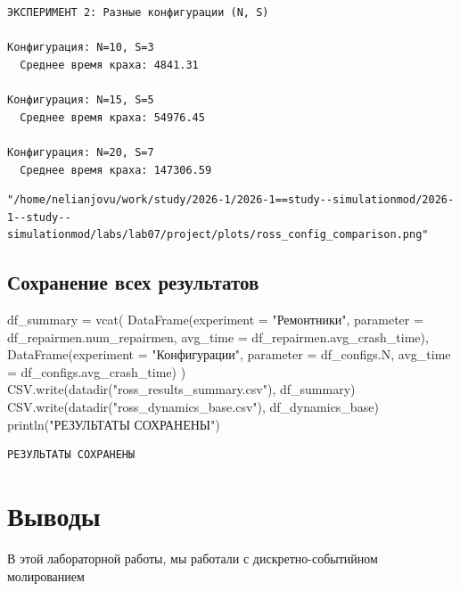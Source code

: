 \documentclass[
  12pt,
  a4paper,
  DIV=11,
  numbers=noendperiod]{scrreprt}
\newenvironment{Shaded}{\begin{snugshade}}{\end{snugshade}}
\newcommand{\FunctionTok}[1]{\textcolor[rgb]{0.28,0.35,0.67}{#1}}
\newcommand{\NormalTok}[1]{\textcolor[rgb]{0.00,0.23,0.31}{#1}}
\newcommand{\OperatorTok}[1]{\textcolor[rgb]{0.37,0.37,0.37}{#1}}
\newcommand{\StringTok}[1]{\textcolor[rgb]{0.13,0.47,0.30}{#1}}
\begin{document}
\begin{verbatim}


ЭКСПЕРИМЕНТ 2: Разные конфигурации (N, S)

Конфигурация: N=10, S=3
  Среднее время краха: 4841.31

Конфигурация: N=15, S=5
  Среднее время краха: 54976.45

Конфигурация: N=20, S=7
  Среднее время краха: 147306.59
\end{verbatim}

\begin{verbatim}
"/home/nelianjovu/work/study/2026-1/2026-1==study--simulationmod/2026-1--study--simulationmod/labs/lab07/project/plots/ross_config_comparison.png"
\end{verbatim}

\section{Сохранение всех
результатов}\label{ux441ux43eux445ux440ux430ux43dux435ux43dux438ux435-ux432ux441ux435ux445-ux440ux435ux437ux443ux43bux44cux442ux430ux442ux43eux432}

\begin{Shaded}
\begin{Highlighting}[]
\NormalTok{df\_summary }\OperatorTok{=} \FunctionTok{vcat}\NormalTok{(}
    \FunctionTok{DataFrame}\NormalTok{(experiment }\OperatorTok{=} \StringTok{"Ремонтники"}\NormalTok{, parameter }\OperatorTok{=}\NormalTok{ df\_repairmen.num\_repairmen, avg\_time }\OperatorTok{=}\NormalTok{ df\_repairmen.avg\_crash\_time),}
    \FunctionTok{DataFrame}\NormalTok{(experiment }\OperatorTok{=} \StringTok{"Конфигурации"}\NormalTok{, parameter }\OperatorTok{=}\NormalTok{ df\_configs.N, avg\_time }\OperatorTok{=}\NormalTok{ df\_configs.avg\_crash\_time)}
\NormalTok{)}
\NormalTok{CSV.}\FunctionTok{write}\NormalTok{(}\FunctionTok{datadir}\NormalTok{(}\StringTok{"ross\_results\_summary.csv"}\NormalTok{), df\_summary)}
\NormalTok{CSV.}\FunctionTok{write}\NormalTok{(}\FunctionTok{datadir}\NormalTok{(}\StringTok{"ross\_dynamics\_base.csv"}\NormalTok{), df\_dynamics\_base)}
\FunctionTok{println}\NormalTok{(}\StringTok{"РЕЗУЛЬТАТЫ СОХРАНЕНЫ"}\NormalTok{)}
\end{Highlighting}
\end{Shaded}

\begin{verbatim}
РЕЗУЛЬТАТЫ СОХРАНЕНЫ
\end{verbatim}

\chapter{Выводы}\label{ux432ux44bux432ux43eux434ux44b}

В этой лабораторной работы, мы работали с дискретно-событийном
молированием


\printbibliography
\end{document}
